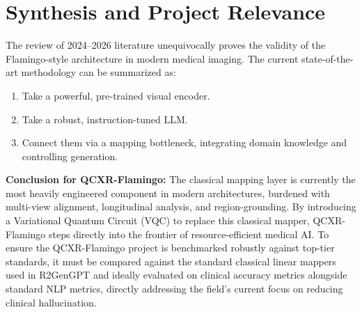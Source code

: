 \documentclass[11pt]{article}
\begin{document}
\section{Synthesis and Project Relevance}

The review of 2024--2026 literature unequivocally proves the validity of the Flamingo-style architecture in modern medical imaging. The current state-of-the-art methodology can be summarized as:
\begin{enumerate}
    \item Take a powerful, pre-trained visual encoder.
    \item Take a robust, instruction-tuned LLM.
    \item Connect them via a mapping bottleneck, integrating domain knowledge and controlling generation.
\end{enumerate}

\textbf{Conclusion for QCXR-Flamingo:}
The classical mapping layer is currently the most heavily engineered component in modern architectures, burdened with multi-view alignment, longitudinal analysis, and region-grounding. By introducing a Variational Quantum Circuit (VQC) to replace this classical mapper, QCXR-Flamingo steps directly into the frontier of resource-efficient medical AI. To ensure the QCXR-Flamingo project is benchmarked robustly against top-tier standards, it must be compared against the standard classical linear mappers used in R2GenGPT \cite{wang2023r2gengpt} and ideally evaluated on clinical accuracy metrics alongside standard NLP metrics, directly addressing the field's current focus on reducing clinical hallucination.



\end{document}
